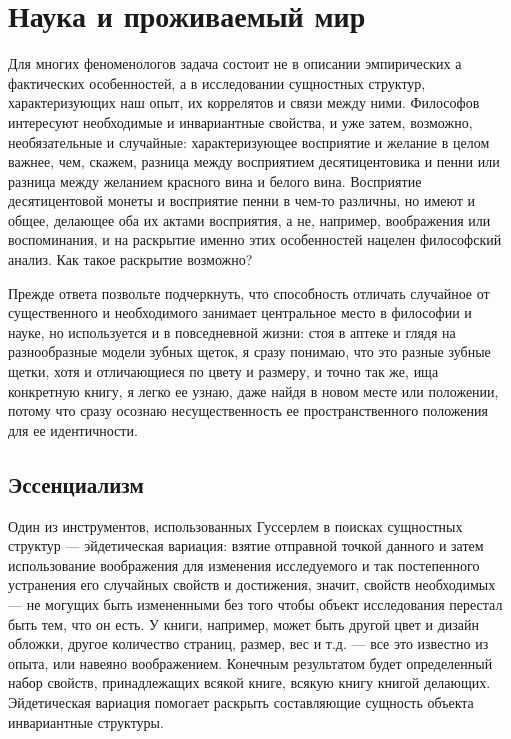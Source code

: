 \documentclass[11pt]{book}
\begin{document}
\chapter{Наука и проживаемый мир}

Для многих феноменологов задача состоит не в описании эмпирических а фактических особенностей, а в исследовании сущностных структур, характеризующих наш опыт, их коррелятов и связи между ними. Философов интересуют необходимые и инвариантные свойства, и уже затем, возможно, необязательные и случайные: характеризующее восприятие и желание в целом важнее, чем, скажем, разница между восприятием десятицентовика и пенни или разница между желанием красного вина и белого вина. Восприятие десятицентовой монеты и восприятие пенни в чем-то различны, но имеют и общее, делающее оба их актами восприятия, а не, например, воображения или воспоминания, и на раскрытие именно этих особенностей нацелен философский анализ. Как такое раскрытие возможно?

Прежде ответа позвольте подчеркнуть, что способность отличать случайное от существенного и необходимого занимает центральное место в философии и науке, но используется и в повседневной жизни: стоя в аптеке и глядя на разнообразные модели зубных щеток, я сразу понимаю, что это разные зубные щетки, хотя и отличающиеся по цвету и размеру, и точно так же, ища конкретную книгу, я легко ее узнаю, даже найдя в новом месте или положении, потому что сразу осознаю несущественность ее пространственного положения для ее идентичности.

\section{Эссенциализм}

Один из инструментов, использованных Гуссерлем в поисках сущностных структур --- эйдетическая вариация: взятие отправной точкой данного и затем использование воображения для изменения исследуемого и так постепенного устранения его случайных свойств и достижения, значит, свойств необходимых --- не могущих быть измененными без того чтобы объект исследования перестал быть тем, что он есть. У книги, например, может быть другой цвет и дизайн обложки, другое количество страниц, размер, вес и т.д. --- все это известно из опыта, или навеяно воображением. Конечным результатом будет определенный набор свойств, принадлежащих всякой книге, всякую книгу книгой делающих. Эйдетическая вариация помогает раскрыть составляющие сущность объекта инвариантные структуры.
\end{document}
